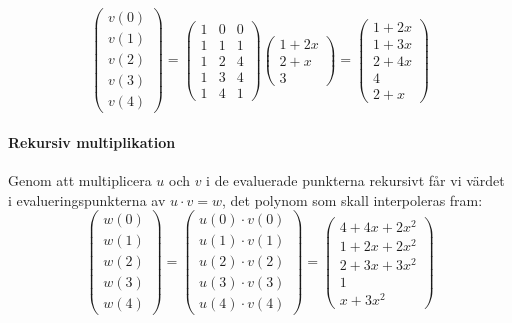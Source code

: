\begin{equation*}
  \begin{pmatrix}
    v(0) \\
    v(1) \\
    v(2) \\
    v(3) \\
    v(4)
  \end{pmatrix} =
  \begin{pmatrix}
    1 & 0 & 0 \\
    1 & 1 & 1 \\
    1 & 2 & 4 \\
    1 & 3 & 4 \\
    1 & 4 & 1
  \end{pmatrix}
  \begin{pmatrix}
    1 + 2x \\
    2 + x \\
    3
  \end{pmatrix} =
  \begin{pmatrix}
    1 + 2x \\
    1 + 3x \\
    2 + 4x \\
    4 \\
    2 + x
  \end{pmatrix}
\end{equation*}

\paragraph{Rekursiv multiplikation}
Genom att multiplicera $u$ och $v$ i de evaluerade punkterna rekursivt får vi
värdet i evalueringspunkterna av $u \cdot v = w$, det polynom som skall
interpoleras fram:
\begin{equation*}
  \begin{pmatrix}
    w(0) \\
    w(1) \\
    w(2) \\
    w(3) \\
    w(4)
  \end{pmatrix} =
  \begin{pmatrix}
    u(0) \cdot v(0) \\
    u(1) \cdot v(1) \\
    u(2) \cdot v(2) \\
    u(3) \cdot v(3) \\
    u(4) \cdot v(4)
  \end{pmatrix} =
  \begin{pmatrix}
    4 + 4x + 2x^2 \\
    1 + 2x + 2x^2 \\
    2 + 3x + 3x^2 \\
    1 \\
    x + 3x^2
  \end{pmatrix}
\end{equation*}

